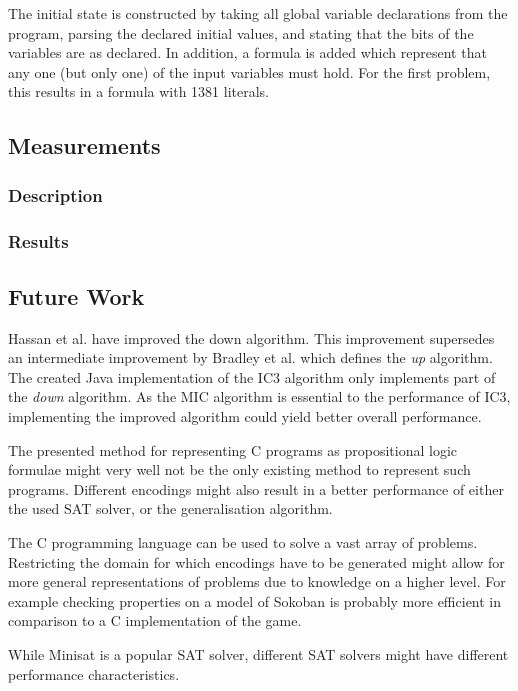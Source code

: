 \documentclass[a4paper]{article}
\begin{document}
The initial state is constructed by taking all global variable declarations from the program, parsing the declared initial values, and stating that the bits of the variables are as declared. In addition, a formula is added which represent that any one (but only one) of the input variables must hold. For the first problem, this results in a formula with 1381 literals.

\subsection{Measurements}
\subsubsection{Description}
\subsubsection{Results}

\subsection{Future Work}
Hassan et al. \cite{Hassan2013} have improved the down algorithm. This improvement supersedes an intermediate improvement by Bradley et al. \cite{Bradley2007} which defines the \emph{up} algorithm. The created Java implementation of the IC3 algorithm only implements part of the \emph{down} algorithm. As the MIC algorithm is essential to the performance of IC3, implementing the improved algorithm could yield better overall performance.

The presented method for representing C programs as propositional logic formulae might very well not be the only existing method to represent such programs. Different encodings might also result in a better performance of either the used SAT solver, or the generalisation algorithm.

The C programming language can be used to solve a vast array of problems. %
Restricting the domain for which encodings have to be generated might allow for more general representations of problems due to knowledge on a higher level. For example checking properties on a model of Sokoban is probably more efficient in comparison to a C implementation of the game.

While Minisat is a popular SAT solver, different SAT solvers might have different performance characteristics.
\end{document}

